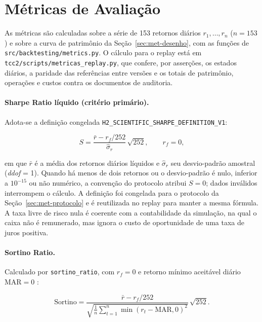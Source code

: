 \documentclass{eic-bcc-tcc}
\begin{document}
\section{Métricas de Avaliação}
\label{sec:met-metricas}

As métricas são calculadas sobre a série de 153 retornos diários $r_1, \ldots, r_n$ ($n = 153$) e sobre a curva de patrimônio da Seção~\ref{sec:met-desenho}, com as funções de \texttt{src/backtesting/metrics.py}. O cálculo para o replay está em \texttt{tcc2/scripts/metricas\_replay.py}, que confere, por asserções, os estados diários, a paridade das referências entre versões e os totais de patrimônio, operações e custos contra os documentos de auditoria.

\paragraph{Sharpe Ratio líquido (critério primário).} Adota-se a definição congelada \texttt{H2\_SCIENTIFIC\_SHARPE\_DEFINITION\_V1}:

\begin{equation}
S = \frac{\bar{r} - r_f/252}{\hat{\sigma}_r}\,\sqrt{252}, \qquad r_f = 0,
\label{eq:met-sharpe}
\end{equation}

\noindent em que $\bar{r}$ é a média dos retornos diários líquidos e $\hat{\sigma}_r$ seu desvio-padrão amostral (\textit{ddof} = 1). Quando há menos de dois retornos ou o desvio-padrão é nulo, inferior a $10^{-15}$ ou não numérico, a convenção do protocolo atribui $S = 0$; dados inválidos interrompem o cálculo. A definição foi congelada para o protocolo da Seção~\ref{sec:met-protocolo} e é reutilizada no replay para manter a mesma fórmula. A taxa livre de risco nula é coerente com a contabilidade da simulação, na qual o caixa não é remunerado, mas ignora o custo de oportunidade de uma taxa de juros positiva.

\paragraph{Sortino Ratio.} Calculado por \texttt{sortino\_ratio}, com $r_f = 0$ e retorno mínimo aceitável diário $\text{MAR} = 0$ \citep{Sortino1994}:

\begin{equation}
\text{Sortino} = \frac{\bar{r} - r_f/252}{\sqrt{\frac{1}{n}\sum_{t=1}^{n}\min(r_t - \text{MAR}, 0)^2}}\,\sqrt{252}.
\label{eq:met-sortino}
\end{equation}
\end{document}
